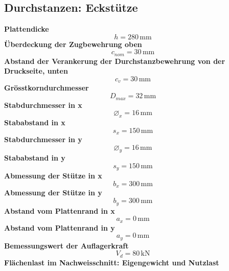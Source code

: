 \documentclass[11pt,a4paper]{article}
\begin{document}
\subsection{Durchstanzen: Eckstütze}
\noindent\textbf{Plattendicke}
\begin{equation*}
h = 280\,\mathrm{mm}
\end{equation*}
\noindent\textbf{Überdeckung der Zugbewehrung oben}
\begin{equation*}
c_{nom} = 30\,\mathrm{mm}
\end{equation*}
\noindent\textbf{Abstand der Verankerung der Durchstanzbewehrung von der Druckseite, unten}
\begin{equation*}
c_v = 30\,\mathrm{mm}
\end{equation*}
\noindent\textbf{Grösstkorndurchmesser}
\begin{equation*}
D_{max} = 32\,\mathrm{mm}
\end{equation*}
\noindent\textbf{Stabdurchmesser in x}
\begin{equation*}
\varnothing_x = 16\,\mathrm{mm}
\end{equation*}
\noindent\textbf{Stababstand in x}
\begin{equation*}
s_x = 150\,\mathrm{mm}
\end{equation*}
\noindent\textbf{Stabdurchmesser in y}
\begin{equation*}
\varnothing_y = 16\,\mathrm{mm}
\end{equation*}
\noindent\textbf{Stababstand in y}
\begin{equation*}
s_y = 150\,\mathrm{mm}
\end{equation*}
\noindent\textbf{Abmessung der Stütze in x}
\begin{equation*}
b_x = 300\,\mathrm{mm}
\end{equation*}
\noindent\textbf{Abmessung der Stütze in y}
\begin{equation*}
b_y = 300\,\mathrm{mm}
\end{equation*}
\noindent\textbf{Abstand vom Plattenrand in x}
\begin{equation*}
a_x = 0\,\mathrm{mm}
\end{equation*}
\noindent\textbf{Abstand vom Plattenrand in y}
\begin{equation*}
a_y = 0\,\mathrm{mm}
\end{equation*}
\noindent\textbf{Bemessungswert der Auflagerkraft}
\begin{equation*}
V_d = 80\,\mathrm{kN}
\end{equation*}
\noindent\textbf{Flächenlast im Nachweisschnitt: Eigengewicht und Nutzlast}
\end{document}
